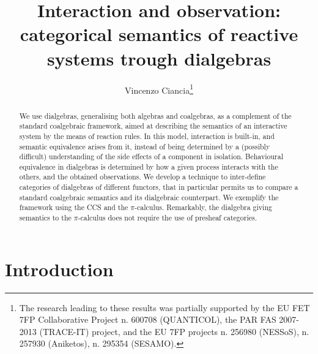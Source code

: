 \documentclass[orivec]{llncs}
\begin{document}
\title{Interaction and observation: categorical semantics of reactive systems trough dialgebras}
\author{Vincenzo Ciancia\thanks{The research leading to these results was partially supported by
the EU FET 7FP Collaborative Project n. 600708 (QUANTICOL), the PAR FAS 2007-2013 (TRACE-IT) project, and the EU 7FP
projects n. 256980 (NESSoS), n. 257930 (Aniketos), n. 295354 (SESAMO).} }
\maketitle
\begin{abstract}
We use dialgebras, generalising both algebras and coalgebras, as a complement of the standard coalgebraic framework, aimed at describing the semantics of an interactive system by the means of reaction rules. In this model, interaction is built-in, and semantic equivalence arises from it, instead of being determined by a (possibly difficult) understanding of the side effects of a component in isolation. Behavioural equivalence in dialgebras is determined by how a given process interacts with the others, and the obtained observations. We develop a technique to inter-define categories of dialgebras of different functors, that in particular permits us to compare a standard coalgebraic semantics and its dialgebraic counterpart. We exemplify the framework using the CCS and the $\pi$-calculus. Remarkably, the dialgebra giving semantics to the $\pi$-calculus does not require the use of presheaf categories.
\end{abstract}

\section{Introduction}
\end{document}
